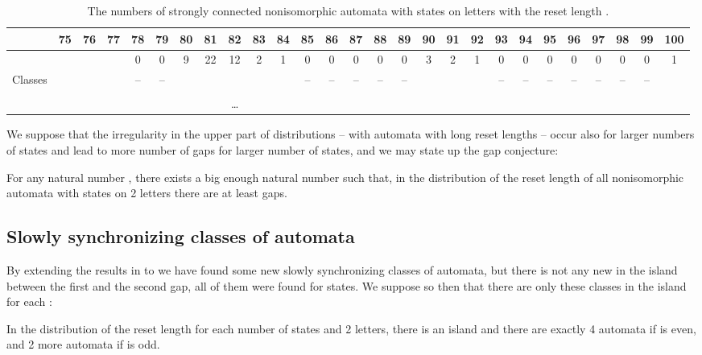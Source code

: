 \documentclass[runningheads,a4paper]{llncs}
\newcommand{\<}{\langle}
\renewcommand{\>}{\rangle}
\begin{document}
\renewcommand{\arraystretch}{1.5}
\begin{table}\label{tab:dist11}
\centering
\caption{The numbers  of strongly connected nonisomorphic automata with  states on  letters with the reset length .}
\begin{tabular}{|p{1cm}||c|c|c|c|c|c|c|c|c|c|c|c|c|c|c|c|c|c|c|c|c|c|c|c|c|c|}\hline
                 &75&76&77&78&79&80&81&82&83&84&85&86&87&88&89&90&91&92&93&94&95&96&97&98&99&100 \\ \hline
&&&&0 &0 &9 &22&12&2 &1 &0 &0 &0 &0 &0 &3 &2 &1 &0 &0 &0 &0 &0 &0 &0 &1 \\ \hline
Classes                &  &  &  &--&--&  &  &&&&--&--&--&--&--&&&&--&--&--&--&--&--&--& \\
                       &  &  &  &  &  &  &  &&&  &  &  &  &  &  &&&  &  &  &  &  &  &  &  & \\
                       &  &  &  &  &  &  &  &\ldots &  &  &  &  &  &  &  &&  &  &  &  &  &  &  &  &  & \\ \hline
\end{tabular}
\end{table}

We suppose that the irregularity in the upper part of distributions -- with automata with long reset lengths -- occur also for larger numbers of states and lead to more number of gaps for larger number of states, and we may state up the gap conjecture:
\begin{conjecture}
For any natural number , there exists a big enough natural number  such that, in the distribution of the reset length of all nonisomorphic automata with  states on 2 letters there are at least  gaps.
\end{conjecture}

\subsection{Slowly synchronizing classes of automata}

By extending the results in \cite{AGV2010} to  we have found some new slowly synchronizing classes of automata, but there is not any new in the island between the first and the second gap, all of them were found for  states. We suppose so then that there are only these classes in the island for each :
\begin{conjecture}
In the distribution of the reset length for each number of states  and 2 letters, there is an island  and there are exactly 4 automata  if  is even, and 2 more automata  if  is odd.
\end{conjecture}
\end{document}
